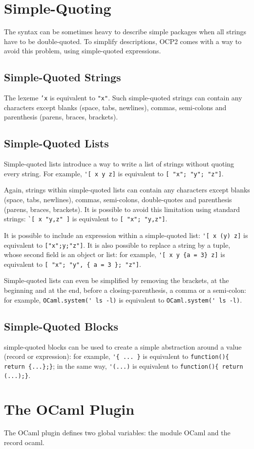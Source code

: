 \section{Simple-Quoting}

The syntax can be sometimes heavy to describe simple packages when all
strings have to be double-quoted. To simplify descriptions, OCP2 comes
with a way to avoid this problem, using simple-quoted expressions.

\subsection{Simple-Quoted Strings}

The lexeme {\tt 'x} is equivalent to {\tt "x"}. Such simple-quoted
strings can contain any characters except blanks (space, tabs,
newlines), commas, semi-colons and parenthesis (parens, braces,
brackets).

\subsection{Simple-Quoted Lists}

Simple-quoted lists introduce a way to write a list of strings without
quoting every string. For example, \verb|'[ x y z]| is equivalent to
\verb|[ "x"; "y"; "z"]|.

Again, strings within simple-quoted lists can contain any characters
except blanks (space, tabs, newlines), commas, semi-colons,
double-quotes and parenthesis (parens, braces, brackets). It is
possible to avoid this limitation using standard strings:
\verb|`[ x "y,z" ]| is equivalent to \verb|[ "x"; "y,z"]|.

It is possible to include an expression within a simple-quoted list:
\verb|'[ x (y) z]| is equivalent to \verb|["x";y;"z"]|. It is also
possible to replace a string by a tuple, whose second field is an object
or list: for example, \verb|'[ x y {a = 3} z]| is equivalent to
\verb|[ "x"; "y", { a = 3 }; "z"]|.

Simple-quoted lists can even be simplified by removing the brackets,
at the beginning and at the end, before a closing-parenthesis, a comma
or a semi-colon: for example, \verb|OCaml.system(' ls -l)| is equivalent
to \verb|OCaml.system(' ls -l)|.

\subsection{Simple-Quoted Blocks}

simple-quoted blocks can be used to create a simple abstraction around a value
(record or expression): for
example, \verb|'{ ... }| is equivalent to
\verb|function(){ return {...};}|;
in the same way, \verb|'(...)| is equivalent to
\verb|function(){ return (...);}|.

\section{The OCaml Plugin}

The OCaml plugin defines two global variables: the module {\sf OCaml} and
the record {\sf ocaml}.
